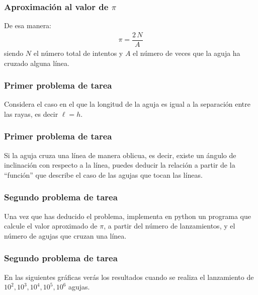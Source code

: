 \documentclass[12pt]{beamer}
\begin{document}
\begin{frame}
\frametitle{Aproximación al valor de $\pi$}
De esa manera: 
\begin{align*}
\pi = \dfrac {2 \, N}{A}
\end{align*}
siendo $N$ el número total de intentos y $A$ el número de veces que la aguja ha cruzado alguna línea.
\end{frame}
\begin{frame}
\frametitle{Primer problema de tarea}
Considera el caso en el que la longitud de la aguja es igual a la separación entre las rayas, es decir $\ell = h$.
\end{frame}
\begin{frame}
\frametitle{Primer problema de tarea}
Si la aguja cruza una línea de manera oblicua, es decir, existe un ángulo de inclinación con respecto a la línea, puedes deducir la relación a partir de la \enquote{función} que describe el caso de las agujas que tocan las líneas.
\end{frame}
\begin{frame}
\frametitle{Segundo problema de tarea}
Una vez que has deducido el problema, implementa en python un programa que calcule el valor aproximado de $\pi$, a partir del número de lanzamientos, y el número de agujas que cruzan una línea.
\end{frame}
\begin{frame}
\frametitle{Segundo problema de tarea}
En las siguientes gráficas verás los resultados cuando se realiza el lanzamiento de $10^{2}, 10^{3}, 10^{4}, 10^{5}, 10^{6}$ agujas.
\end{frame}
\end{document}
